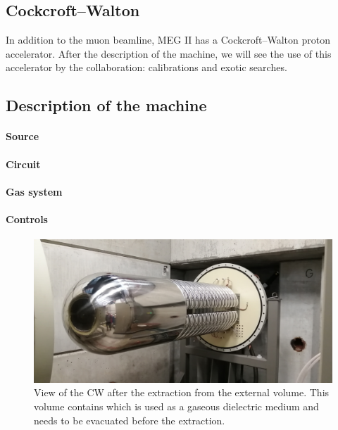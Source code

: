 \begin{refsection}
\section{Cockcroft–Walton}
    In addition to the muon beamline, MEG II has a Cockcroft–Walton proton accelerator. 
    After the description of the machine, we will see the use of this accelerator by the collaboration: calibrations and exotic searches. 

    \subsection{Description of the machine}
        \paragraph{Source}
        \paragraph{Circuit}
        \paragraph{Gas system}
        \paragraph{Controls}

        \begin{figure}
            \centering
            \includegraphics[width=1\textwidth]{Figures/MEG/CW/view_front.jpg}
            \caption{View of the CW after the extraction from the external volume. This volume contains  which is used as a gaseous dielectric medium and needs to be evacuated before the extraction.}
            \label{fig:CW:view}
            \end{figure}


\end{refsection}
